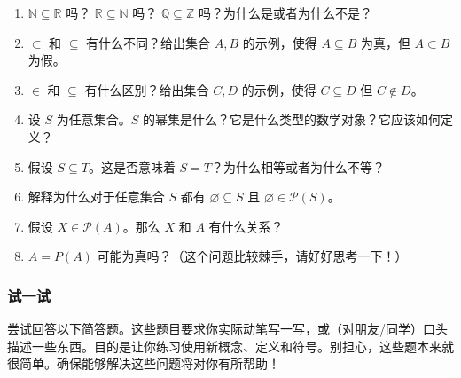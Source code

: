 \begin{enumerate}[label=(\arabic*)]
    \item $\mathbb{N} \subseteq \mathbb{R}$ 吗？ $\mathbb{R} \subseteq \mathbb{N}$ 吗？ $\mathbb{Q} \subseteq \mathbb{Z}$ 吗？为什么是或者为什么不是？
    \item $\subset$ 和 $\subseteq$ 有什么不同？给出集合 $A, B$ 的示例，使得 $A \subseteq B$ 为真，但 $A \subset B$ 为假。
    \item $\in$ 和 $\subseteq$ 有什么区别？给出集合 $C, D$ 的示例，使得 $C \subseteq D$ 但 $C \notin D$。
    \item 设 $S$ 为任意集合。$S$ 的幂集是什么？它是什么类型的数学对象？它应该如何定义？
    \item 假设 $S \subseteq T$。这是否意味着 $S = T$？为什么相等或者为什么不等？
    \item 解释为什么对于任意集合 $S$ 都有 $\varnothing \subseteq S$ 且 $\varnothing \in \mathcal{P}(S)$。
    \item 假设 $X \in \mathcal{P}(A)$。那么 $X$ 和 $A$ 有什么关系？
    \item $A = P(A)$ 可能为真吗？（这个问题比较棘手，请好好思考一下！）
\end{enumerate}

\subsubsection*{试一试}

尝试回答以下简答题。这些题目要求你实际动笔写一写，或（对朋友/同学）口头描述一些东西。目的是让你练习使用新概念、定义和符号。别担心，这些题本来就很简单。确保能够解决这些问题将对你有所帮助！

